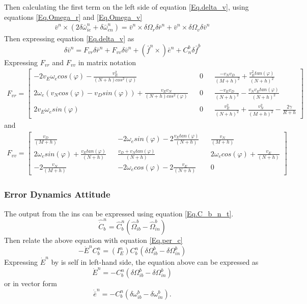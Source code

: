 Then calculating the first term on the left side of equation \eqref{Eq.delta_v}, using equations \eqref{Eq.Omega_r} and \eqref{Eq.Omega_v}
\begin{align}
\bar{v}^n\times(2\delta \bar{\omega}_{ie}^n+\delta \bar{\omega}_{en}^n) = 
\bar{v}^n \times \delta\Omega_r\delta\bar{r}^n +\bar{v}^n\times\delta\Omega_v\delta\bar{v}^n
\end{align}
Then expressing equation \eqref{Eq.delta_v} as
\begin{equation}
\delta\bar{v}^n = F_{vr}\delta\bar{r}^n + F_{vv}\delta\bar{v}^n + (\bar{f}^n	\times)\bar{e}^n + C_n^b\delta \bar{f}^b
\end{equation}
Expressing $F_{vr}$ and $F_{vv}$ in matrix notation
\begin{align}
F_{vr} = 
\begin{bmatrix}
-2v_E\omega_e cos(\varphi)-\frac{v_E^2}{(N+h)cos^2(\varphi)} && 0 && \frac{-v_N v_D}{(M+h)^2} + \frac{v_E^2 tan(\varphi)}{(N+h)^2} \\
2\omega_e(v_N cos(\varphi)-v_D sin(\varphi)) + \frac{v_Ev_N}{(N+h)cos^2(\varphi)} && 0 && \frac{-v_E v_D}{(N+h)^2} - \frac{v_Nv_E tan(\varphi)}{(N+h)^2} \\
2v_E\omega_e sin(\varphi) && 0 && \frac{v_E^2}{(N+h)^2} + \frac{v_N^2}{(M+h)^2} - \frac{2\gamma}{R+h}
\end{bmatrix}
\label{Eq.Fvr}
\end{align}
and
\begin{align}
F_{vv} = 
\begin{bmatrix}
\frac{v_D}{(M+h)} && -2\omega_e sin(\varphi) -2\frac{v_Etan(\varphi)}{(N+h)} && \frac{v_N}{(M+h)} \\
2\omega_e sin(\varphi) +\frac{v_E tan(\varphi)}{(N+h)} && \frac{v_D + v_N tan(\varphi)}{(N+h)} && 2\omega_e cos(\varphi)+ \frac{v_E}{(N+h)} \\
-2\frac{v_N}{(M+h)} && -2\omega_e cos(\varphi) -2\frac{v_E}{(N+h)} && 0
\end{bmatrix}
\label{Eq.Fvv}
\end{align}

\subsubsection{Error Dynamics Attitude}
The output from the \gls{ins} can be expressed using equation \eqref{Eq.C_b_n_t}.
\begin{equation}
\hat{\dot{C}}_b^n = \hat{C}_b^n(\hat{\Omega}_{ib}^b - \hat{\Omega}_{in}^b)
\end{equation}
Then relate the above equation with equation \eqref{Eq.per_c}
\begin{equation}
-\dot{E}^nC_b^n = (I_E^n)C_b^n(\delta\Omega_{ib}^b-\delta\Omega_{in}^b)
\end{equation}
Expressing $\dot{E}^n$ by is self in left-hand side, the equation above can be expressed as
\begin{equation}
\dot{E}^n = -C_b^n(\delta\Omega_{ib}^b-\delta\Omega_{in}^b)
\end{equation}
or in vector form
\begin{equation}
\dot{\bar{e}}^n = -C_b^n(\delta\omega_{ib}^b-\delta\omega_{in}^b).
\label{Eq.error_vec}
\end{equation}

